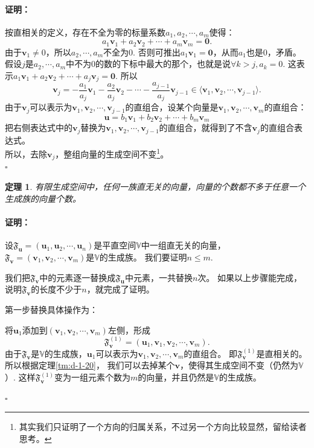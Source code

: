\documentclass[12pt,UTF8]{ctexbook}
\renewenvironment{proof}{\paragraph{\textbf{证明：}}}{\hfill$\square$}
\newtheorem{tm}{定理}[section]
\begin{document}
\begin{appendix}
\begin{proof}
    按直相关的定义，存在不全为零的标量系数$a_1, a_2, \cdots, a_m$使得：
    $$ a_1\mathbf{v}_1+a_2\mathbf{v}_2+\cdots+a_m\mathbf{v}_m = \mathbf{0}. $$
    由于$\mathbf{v}_1 \neq 0$，所以$a_2, \cdots, a_m$不全为0. 否则可推出$a_1\mathbf{v}_1 = \mathbf{0}$，从而$a_1$也是0，矛盾。\\
    假设$j$是$a_2, \cdots, a_m$中不为0的数的下标中最大的那个，也就是说$\forall k > j, a_k = 0$. 这表示$ a_1\mathbf{v}_1+a_2\mathbf{v}_2+\cdots+a_j\mathbf{v}_j = \mathbf{0}. $
    所以
    $$ \mathbf{v}_j = -\frac{a_1}{a_j}\mathbf{v}_1-\frac{a_2}{a_j}\mathbf{v}_2-\cdots-\frac{a_{j-1}}{a_j}\mathbf{v}_{j-1} \in \langle \mathbf{v}_1, \mathbf{v}_2 , \cdots , \mathbf{v}_{j-1}\rangle. $$
    由于$ \mathbf{v}_j$可以表示为$\mathbf{v}_1, \mathbf{v}_2 , \cdots , \mathbf{v}_{j-1}$的直组合，设某个向量是$\mathbf{v}_1, \mathbf{v}_2 , \cdots , \mathbf{v}_m$的直组合：
    $$ \mathbf{u} = b_1\mathbf{v}_1+b_2\mathbf{v}_2+\cdots+b_m\mathbf{v}_m$$
    把右侧表达式中的$\mathbf{v}_j$替换为$\mathbf{v}_1, \mathbf{v}_2 , \cdots , \mathbf{v}_{j-1}$的直组合，就得到了不含$\mathbf{v}_j$的直组合表达式。\\
    所以，去除$\mathbf{v}_j$，整组向量的生成空间不变\footnote{其实我们只证明了一个方向的归属关系，不过另一个方向比较显然，留给读者思考。}。\\
\end{proof}

\begin{tm}\label{tm:d-1-30}
    有限生成空间中，任何一族直无关的向量，向量的个数都不多于任意一个生成族的向量个数。
\end{tm}

\begin{proof}
    
    设$\mathfrak{F}_{\mathbf{u}} = (\mathbf{u}_1, \mathbf{u}_2, \cdots , \mathbf{u}_n )$是平直空间$\mathbb{V}$中一组直无关的向量，
    $\mathfrak{F}_{\mathbf{v}} = (\mathbf{v}_1, \mathbf{v}_2, \cdots , \mathbf{v}_m )$是$\mathbb{V}$的生成族。
    我们要证明$n \leq m$. 

    我们把$\mathfrak{F}_{\mathbf{v}}$中的元素逐一替换成$\mathfrak{F}_{\mathbf{u}}$中元素，一共替换$n$次。
    如果以上步骤能完成，说明$\mathfrak{F}_{\mathbf{v}}$的长度不少于$n$，就完成了证明。

    第一步替换具体操作为：

    将$\mathbf{u}_1$添加到$(\mathbf{v}_1, \mathbf{v}_2, \cdots , \mathbf{v}_m )$左侧，形成
    $$\mathfrak{F}_{\mathbf{v}}^{(1)} = (\mathbf{u}_1, \mathbf{v}_1, \mathbf{v}_2, \cdots , \mathbf{v}_m ).$$
    由于$\mathfrak{F}_{\mathbf{v}}$是$\mathbb{V}$的生成族，$\mathbf{u}_1$可以表示为$\mathbf{v}_1, \mathbf{v}_2, \cdots , \mathbf{v}_m$的直组合。
    即$\mathfrak{F}_{\mathbf{v}}^{(1)}$是直相关的。所以根据定理\ref{tm:d-1-20}，
    我们可以去掉某个$\mathbf{v}$，使得其生成空间不变（仍然为$\mathbb{V}$）.
    这样$\mathfrak{F}_{\mathbf{v}}^{(1)}$变为一组元素个数为$m$的向量，并且仍然是$\mathbb{V}$的生成族。
    

\end{proof}
\end{appendix}
\end{document}
